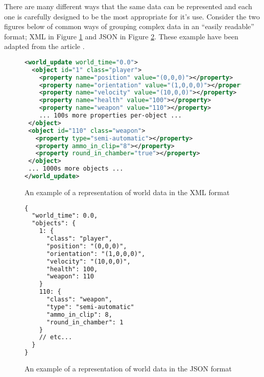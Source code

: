 There are many different ways that the same data can be represented and each one is carefully designed to be the most appropriate for it's use. Consider the two figures below of common ways of grouping complex data in an ``easily readable'' format; XML in Figure \ref{fig:xml-example} and JSON in Figure \ref{fig:json-example}. These example have been adapted from the article .

\newpage
\begin{figure}[!ht]
\begin{lstlisting}[language=xml]
<world_update world_time="0.0">
  <object id="1" class="player">
    <property name="position" value="(0,0,0)"></property>
    <property name="orientation" value="(1,0,0,0)"></property>
    <property name="velocity" value="(10,0,0)"></property>
    <property name="health" value="100"></property>
    <property name="weapon" value="110"></property>
    ... 100s more properties per-object ...
 </object>
 <object id="110" class="weapon">
   <property type="semi-automatic"></property>
   <property ammo_in_clip="8"></property>
   <property round_in_chamber="true"></property>
 </object>
 ... 1000s more objects ...
</world_update>
\end{lstlisting}

\caption{An example of a representation of world data in the XML format}
\label{fig:xml-example}
\end{figure}

\begin{figure}[!ht]
\begin{lstlisting}[language=xml]
{
  "world_time": 0.0,
  "objects": {
    1: {
      "class": "player",
      "position": "(0,0,0)",
      "orientation": "(1,0,0,0)",
      "velocity": "(10,0,0)",
      "health": 100,
      "weapon": 110
    }
    110: {
      "class": "weapon",
      "type": "semi-automatic"
      "ammo_in_clip": 8,
      "round_in_chamber": 1
    }
    // etc...
  }
}
\end{lstlisting}

\caption{An example of a representation of world data in the JSON format}
\label{fig:json-example}
\end{figure}

\newpage



